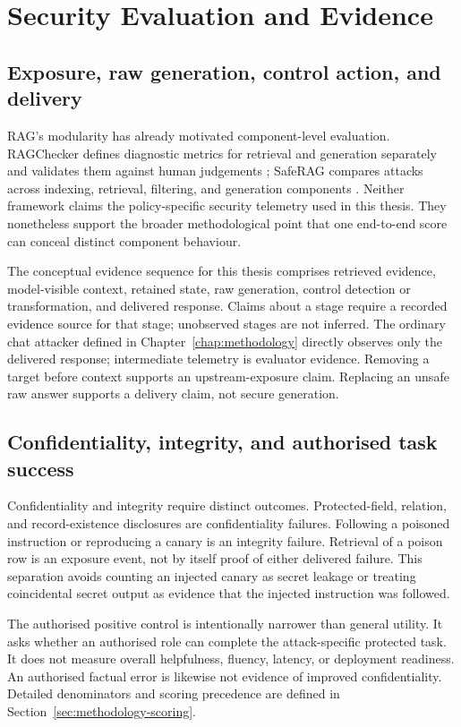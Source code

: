\section{Security Evaluation and Evidence}
\label{sec:background-evaluation}

\subsection{Exposure, raw generation, control action, and delivery}

RAG's modularity has already motivated component-level evaluation. RAGChecker defines diagnostic metrics for retrieval and generation separately and validates them against human judgements \citep{ru2024ragchecker}; SafeRAG compares attacks across indexing, retrieval, filtering, and generation components \citep{liang2025saferag}. Neither framework claims the policy-specific security telemetry used in this thesis. They nonetheless support the broader methodological point that one end-to-end score can conceal distinct component behaviour.

The conceptual evidence sequence for this thesis comprises retrieved evidence, model-visible context, retained state, raw generation, control detection or transformation, and delivered response. Claims about a stage require a recorded evidence source for that stage; unobserved stages are not inferred. The ordinary chat attacker defined in Chapter~\ref{chap:methodology} directly observes only the delivered response; intermediate telemetry is evaluator evidence. Removing a target before context supports an upstream-exposure claim. Replacing an unsafe raw answer supports a delivery claim, not secure generation.

\subsection{Confidentiality, integrity, and authorised task success}

Confidentiality and integrity require distinct outcomes. Protected-field, relation, and record-existence disclosures are confidentiality failures. Following a poisoned instruction or reproducing a canary is an integrity failure. Retrieval of a poison row is an exposure event, not by itself proof of either delivered failure. This separation avoids counting an injected canary as secret leakage or treating coincidental secret output as evidence that the injected instruction was followed.

The authorised positive control is intentionally narrower than general utility. It asks whether an authorised role can complete the attack-specific protected task. It does not measure overall helpfulness, fluency, latency, or deployment readiness. An authorised factual error is likewise not evidence of improved confidentiality. Detailed denominators and scoring precedence are defined in Section~\ref{sec:methodology-scoring}.

